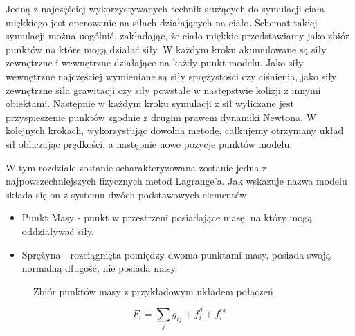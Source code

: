Jedną z najczęściej wykorzystywanych technik służących do symulacji ciała miękkiego jest operowanie na siłach działających na ciało. Schemat takiej symulacji można uogólnić, zakładając, że ciało miękkie przedstawiamy jako zbiór punktów na które mogą działać siły. W każdym kroku akumulowane są siły zewnętrzne i wewnętrzne działające na każdy punkt modelu. Jako siły wewnętrzne najczęściej wymieniane są siły sprężystości czy ciśnienia, jako siły zewnętrzne siła grawitacji czy siły powstałe w następstwie kolizji z innymi obiektami. Następnie w każdym kroku symulacji z sił wyliczane jest przyspieszenie punktów zgodnie z drugim prawem dynamiki Newtona. W kolejnych krokach, wykorzystując dowolną metodę, całkujemy otrzymany układ sił obliczając prędkości, a następnie nowe pozycje punktów modelu.\cite{pbdyn}

W tym rozdziale zostanie scharakteryzowana zostanie jedna z najpowszechniejszych
fizycznych metod Lagrange'a. Jak wskazuje nazwa modelu składa się on z systemu dwóch podstawowych elementów:
\begin{itemize}
\item  Punkt Masy - punkt w przestrzeni posiadające masę, na który mogą oddziaływać siły.
\item Sprężyna - rozciągnięta pomiędzy dwoma punktami masy, posiada swoją normalną długość, nie posiada masy.

\end{itemize} 

\begin{figure}[ht]
\centering

\caption{Zbiór punktów masy z przykładowym układem połączeń}
\end{figure}

%
%
\begin{equation}
F_{i} = \sum_{j} g_{ij} + f^{d}_i + f^{ex}_{i}
\end{equation}

